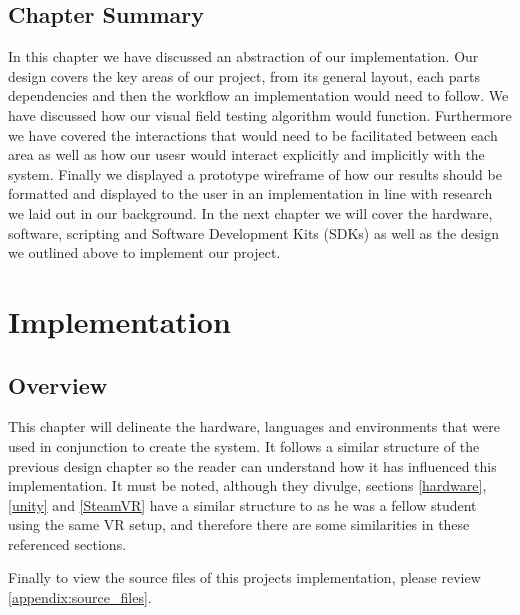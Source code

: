 \documentclass{l4proj}
\begin{document}
\section{Chapter Summary}
In this chapter we have discussed an abstraction of our implementation. Our design covers the key areas of our project, from its general layout, each parts dependencies and then the workflow an implementation would need to follow. We have discussed how our visual field testing algorithm would function. Furthermore we have covered the interactions that would need to be facilitated between each area as well as how our usesr would interact explicitly and implicitly with the system. Finally we displayed a prototype wireframe of how our results should be formatted and displayed to the user in an implementation in line with research we laid out in our background. In the next chapter we will cover the hardware, software, scripting and Software Development Kits (SDKs) as well as the design we outlined above to implement our project.


\chapter{Implementation}
\section{Overview}
This chapter will delineate the hardware, languages and environments that were used in conjunction to create the system. It follows a similar structure of the previous design chapter so the reader can understand how it has influenced this implementation. It must be noted, although they divulge, sections \ref{hardware}, \ref{unity} and \ref{SteamVR} have a similar structure to \citet{russell2023} as he was a fellow student using the same VR setup, and therefore there are some similarities in these referenced sections. 

Finally to view the source files of this projects implementation, please review \ref{appendix:source_files}.
\end{document}
